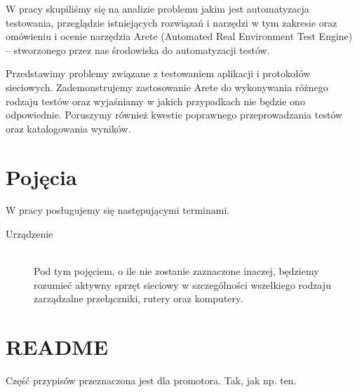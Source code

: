 \documentclass[00-praca-magisterska.tex]{subfiles}
\begin{document}
W pracy skupiliśmy się na analizie problemu jakim jest automatyzacja
testowania, przeglądzie istniejących rozwiązań i narzędzi w tym zakresie oraz
omówieniu i ocenie narzędzia Arete (Automated Real Environment Test Engine) --
stworzonego przez nas środowiska do automatyzacji testów.

Przedstawimy problemy związane z testowaniem aplikacji i protokołów sieciowych.
Zademonstrujemy zastosowanie Arete do wykonywania różnego rodzaju testów oraz
wyjaśniamy w jakich przypadkach nie będzie ono odpowiednie. Poruszymy również
kwestie poprawnego przeprowadzania testów oraz katalogowania wyników.

\section{Pojęcia}

W pracy posługujemy się następującymi terminami. 

\begin{description}
  \item[Urządzenie] \hfill \\
Pod tym pojęciem, o ile nie zostanie zaznaczone inaczej, będziemy rozumieć
aktywny sprzęt sieciowy w szczególności wszelkiego rodzaju zarządzalne
przełączniki, rutery oraz komputery.
\end{description}

\section{README}

Część przypisów przeznaczona jest dla promotora. Tak, jak np. ten.


\end{document}
